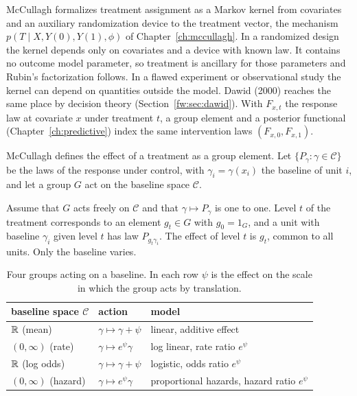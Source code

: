 McCullagh formalizes treatment assignment as a Markov kernel from covariates and an auxiliary randomization device to the treatment vector, the mechanism $p(T\mid X,Y(0),Y(1),\phi)$ of Chapter~\ref{ch:mccullagh}. In a randomized design the kernel depends only on covariates and a device with known law. It contains no outcome model parameter, so treatment is ancillary for those parameters and Rubin's factorization follows. In a flawed experiment or observational study the kernel can depend on quantities outside the model. Dawid (2000) reaches the same place by decision theory (Section~\ref{fw:sec:dawid}). With $F_{x,t}$ the response law at covariate $x$ under treatment $t$, a group element and a posterior functional (Chapter~\ref{ch:predictive}) index the same intervention laws $(F_{x,0},F_{x,1})$.

McCullagh defines the effect of a treatment as a group element. Let $\{P_\gamma:\gamma\in\mathcal C\}$ be the laws of the response under control, with $\gamma_i=\gamma(x_i)$ the baseline of unit $i$, and let a group $G$ act on the baseline space $\mathcal C$.

\begin{definition}\label{gr:def:effect}
Assume that $G$ acts freely on $\mathcal C$ and that $\gamma\mapsto P_\gamma$ is one to one. Level $t$ of the treatment corresponds to an element $g_t\in G$ with $g_0=1_G$, and a unit with baseline $\gamma_i$ given level $t$ has law $P_{g_t\gamma_i}$. The effect of level $t$ is $g_t$, common to all units. Only the baseline varies.
\end{definition}



\begin{table}[ht]
\centering
\caption{Four groups acting on a baseline. In each row $\psi$ is the effect on the scale in which the group acts by translation.}
\label{gr:tab:groups}
\begin{tabular}{@{}lll@{}}
\toprule
baseline space $\mathcal C$ & action & model \\
\midrule
$\mathbb{R}$ (mean) & $\gamma\mapsto\gamma+\psi$ & linear, additive effect \\
$(0,\infty)$ (rate) & $\gamma\mapsto e^{\psi}\gamma$ & log linear, rate ratio $e^{\psi}$ \\
$\mathbb{R}$ (log odds) & $\gamma\mapsto\gamma+\psi$ & logistic, odds ratio $e^{\psi}$ \\
$(0,\infty)$ (hazard) & $\gamma\mapsto e^{\psi}\gamma$ & proportional hazards, hazard ratio $e^{\psi}$ \\
\bottomrule
\end{tabular}
\end{table}


